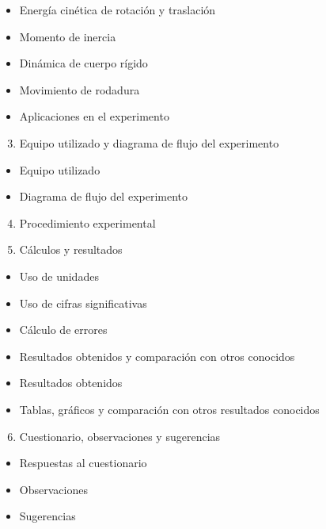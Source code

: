 \documentclass[10pt]{article}
\begin{document}
\begin{itemize}
  \item Energía cinética de rotación y traslación
  \item Momento de inercia
  \item Dinámica de cuerpo rígido
  \item Movimiento de rodadura
  \item Aplicaciones en el experimento
\end{itemize}

\begin{enumerate}
  \setcounter{enumi}{2}
  \item Equipo utilizado y diagrama de flujo del experimento
\end{enumerate}

\begin{itemize}
  \item Equipo utilizado
  \item Diagrama de flujo del experimento
\end{itemize}

\begin{enumerate}
  \setcounter{enumi}{3}
  \item Procedimiento experimental
  \item Cálculos y resultados
\end{enumerate}

\begin{itemize}
  \item Uso de unidades
  \item Uso de cifras significativas
  \item Cálculo de errores
  \item Resultados obtenidos y comparación con otros conocidos
  \item Resultados obtenidos
  \item Tablas, gráficos y comparación con otros resultados conocidos
\end{itemize}

\begin{enumerate}
  \setcounter{enumi}{5}
  \item Cuestionario, observaciones y sugerencias
\end{enumerate}

\begin{itemize}
  \item Respuestas al cuestionario
  \item Observaciones
  \item Sugerencias
\end{itemize}
\end{document}
